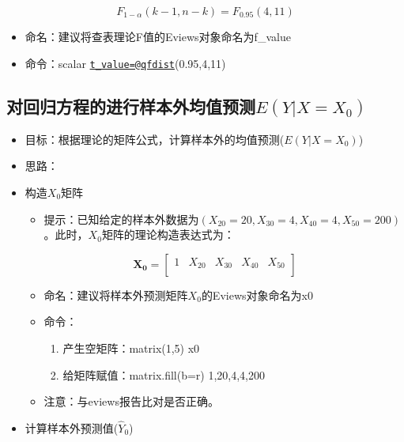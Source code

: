 \documentclass[12pt,(landscape,a4paper),(portrait,a4paper)]{article}
\providecommand{\tightlist}{%
  \setlength{\itemsep}{0pt}\setlength{\parskip}{0pt}}
\begin{document}
\[F_{1-\alpha}(k-1,n-k)=F_{0.95}(4,11)\]

\begin{itemize}
\tightlist
\item
  命名：建议将查表理论F值的Eviews对象命名为f\_value
\item
  命令：scalar
  \href{mailto:t_value=@qfdist}{\nolinkurl{t\_value=@qfdist}}(0.95,4,11)
\end{itemize}

\hypertarget{eyxx_0}{%
\subsection{\texorpdfstring{对回归方程的进行样本外均值预测\(E(Y|X=X_0)\)}{对回归方程的进行样本外均值预测E(Y\textbar{}X=X\_0)}}\label{eyxx_0}}

\begin{itemize}
\item
  目标：根据理论的矩阵公式，计算样本外的均值预测(\(E(Y|X=X_0)\))
\item
  思路：
\item
  构造\(X_0\)矩阵

  \begin{itemize}
  \tightlist
  \item
    提示：已知给定的样本外数据为\((X_{20}=20,X_{30}=4,X_{40}=4,X_{50}=200)\)。此时，\(X_0\)矩阵的理论构造表达式为：
  \end{itemize}

  \[\mathbf{X_0}= \begin{bmatrix}1 & X_{20} & X_{30} & X_{40} & X_{50}\\\end{bmatrix}\]

  \begin{itemize}
  \tightlist
  \item
    命名：建议将样本外预测矩阵\(X_0\)的Eviews对象命名为x0
  \item
    命令：

    \begin{enumerate}
    \def\labelenumi{\alph{enumi}.}
    \tightlist
    \item
      产生空矩阵：matrix(1,5) x0
    \item
      给矩阵赋值：matrix.fill(b=r) 1,20,4,4,200
    \end{enumerate}
  \item
    注意：与eviews报告比对是否正确。
  \end{itemize}
\item
  计算样本外预测值(\(\hat{Y}_0\))


\end{itemize}
\end{document}
